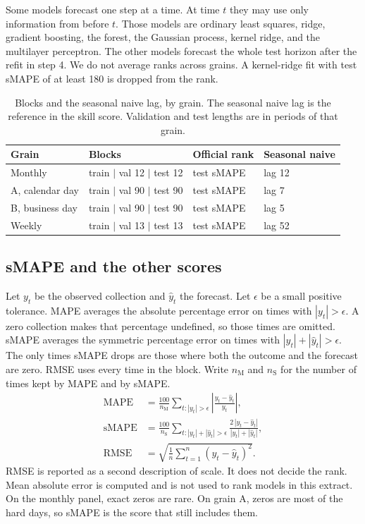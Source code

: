 Some models forecast one step at a time.
At time $t$ they may use only information from before $t$.
Those models are ordinary least squares, ridge, gradient boosting, the forest, the Gaussian process, kernel ridge, and the multilayer perceptron.
The other models forecast the whole test horizon after the refit in step 4.
We do not average ranks across grains.
A kernel-ridge fit with test sMAPE of at least 180 is dropped from the rank.

\begin{table}[t]
  \caption{Blocks and the seasonal naive lag, by grain.
  The seasonal naive lag is the reference in the skill score.
  Validation and test lengths are in periods of that grain.}
  \label{tab:protocol}
  \centering
  \small
  \begin{tabular}{llll}
    \toprule
    Grain & Blocks & Official rank & Seasonal naive \\
    \midrule
    Monthly & train $|$ val 12 $|$ test 12 & test sMAPE & lag 12 \\
    A, calendar day & train $|$ val 90 $|$ test 90 & test sMAPE & lag 7 \\
    B, business day & train $|$ val 90 $|$ test 90 & test sMAPE & lag 5 \\
    Weekly & train $|$ val 13 $|$ test 13 & test sMAPE & lag 52 \\
    \bottomrule
  \end{tabular}
\end{table}

\subsection{sMAPE and the other scores}
\label{sec:metrics}

Let $y_t$ be the observed collection and $\hat y_t$ the forecast.
Let $\epsilon$ be a small positive tolerance.
MAPE averages the absolute percentage error on times with $|y_t| \gt \epsilon$.
A zero collection makes that percentage undefined, so those times are omitted.
sMAPE averages the symmetric percentage error on times with $|y_t| + |\hat y_t| \gt \epsilon$.
The only times sMAPE drops are those where both the outcome and the forecast are zero.
RMSE uses every time in the block.
Write $n_{\mathrm{M}}$ and $n_{\mathrm{S}}$ for the number of times kept by MAPE and by sMAPE.
\begin{align}
  \mathrm{MAPE}
  &= \frac{100}{n_{\mathrm{M}}}
     \sum_{t : |y_t| \gt \epsilon}
     \left|\frac{y_t - \hat y_t}{y_t}\right|,
  \label{eq:mape}\\
  \mathrm{sMAPE}
  &= \frac{100}{n_{\mathrm{S}}}
     \sum_{t : |y_t| + |\hat y_t| \gt \epsilon}
     \frac{2\,|y_t - \hat y_t|}{|y_t| + |\hat y_t|},
  \label{eq:smape}\\
  \mathrm{RMSE}
  &= \sqrt{\frac{1}{n}\sum_{t=1}^{n}(y_t - \hat y_t)^2}.
  \label{eq:rmse}
\end{align}
RMSE is reported as a second description of scale.
It does not decide the rank.
Mean absolute error is computed and is not used to rank models in this extract.
On the monthly panel, exact zeros are rare.
On grain A, zeros are most of the hard days, so sMAPE is the score that still includes them.

